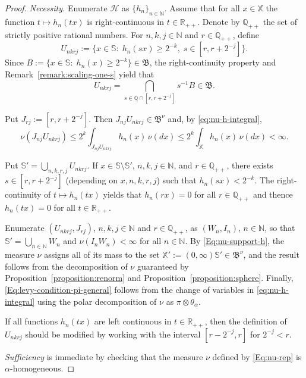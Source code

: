 \documentclass[12pt]{amsart}
\numberwithin{equation}{section}
\numberwithin{figure}{section}
\theoremstyle{plain} \newtheorem{theorem}{Theorem}[section]
\theoremstyle{plain} \newtheorem{proposition}[theorem]{Proposition}
\theoremstyle{plain} \newtheorem{lemma}[theorem]{Lemma}
\theoremstyle{plain} \newtheorem{corollary}[theorem]{Corollary}
\theoremstyle{definition} \newtheorem{definition}[theorem]{Definition}
\theoremstyle{definition} \newtheorem{notation}[theorem]{Notation}
\theoremstyle{remark} \newtheorem{remark}[theorem]{Remark}
\theoremstyle{remark} \newtheorem{example}[theorem]{Example}
\theoremstyle{definition} \newtheorem{assumption}{Assumption}
\newcommand{\bN}{\mathbb{N}}
\newcommand{\bQ}{\mathbb{Q}}
\newcommand{\bR}{\mathbb{R}}
\newcommand{\bS}{\mathbb{S}}
\newcommand{\bX}{\mathbb{X}}
\newcommand{\cH}{\mathcal{H}}
\newcommand{\salg}{\mathfrak{B}}
\begin{document}
\begin{proof}
  \textsl{Necessity.} Enumerate $\cH$ as $\{h_n\}_{n \in \bN}$. Assume
  that for all $x \in \bX$ the function $t \mapsto h_n(tx)$ is 
	right-continuous in $t\in\bR_{++}$.  Denote by $\bQ_{++}$ the set of
  strictly positive rational numbers. For $n,k,j\in\bN$ and
  $r\in\bQ_{++}$, define
  \begin{displaymath}
    U_{nkrj}:=\{x\in\bS:\; h_n(sx)\geq 2^{-k},\; s\in[r,r+2^{-j}]\}.
  \end{displaymath}
  Since $B:=\{x \in \bS:\;h_n(x)\geq 2^{-k}\} \in \salg$, the
	right-continuity property and Remark~\ref{remark:scaling-one-s} yield that
  \begin{displaymath}
    U_{nkrj}=\bigcap_{s\in\bQ\cap[r,r+2^{-j}]}s^{-1}B\in \salg.
  \end{displaymath}

  Put $J_{rj} :=[r,r+2^{-j}]$. Then $J_{nj} U_{nkrj} \in \salg^\nu$
  and, by \eqref{eq:nu-h-integral},
  \begin{displaymath}
    \nu(J_{nj} U_{nkrj}) 
    \leq 2^k \int_{J_{nj} U_{nkrj}} h_n(x) \, \nu(dx)
    \leq 2^k \int_\bX h_n(x) \, \nu(dx)<\infty.
  \end{displaymath}
  
  Put $\bS' = \bigcup_{n,k,r,j} U_{nkrj}$.  If $x\in\bS\setminus\bS'$,
  $n,k,j \in \bN$, and $r \in \bQ_{++}$, there exists $s \in
  [r,r+2^{-j}]$ (depending on $x,n,k,r,j$) such that $h_n(s
  x)<2^{-k}$.  The right-continuity of $t \mapsto h_n(t x)$ yields
  that $h_n(r x)=0$ for all $r\in\bQ_{++}$ and thence $h_n(tx)=0$ for
  all $t\in\bR_{++}$.
	
  Enumerate $(U_{nkrj}, J_{rj})$, $n,k,j\in\bN$ and $r\in\bQ_{++}$, as
  $(W_n, I_n)$, $n \in \bN$, so that $\bS' = \bigcup_{n \in \bN} W_n$
  and $\nu(I_n W_n)< \infty$ for all $n \in \bN$.  By
  \eqref{Eq:nu-support-h}, the measure $\nu$ assigns all of its mass
  to the set $\bX':= (0,\infty) \bS' \in \salg^\nu$, and the result
  follows from the decomposition of $\nu$ guaranteed by
  Proposition~\ref{proposition:renorm} and
  Proposition~\ref{proposition:sphere}.  Finally,
  \eqref{Eq:levy-condition-pi-general} follows from the change of
  variables in \eqref{eq:nu-h-integral} using the polar decomposition of
  $\nu$ as $\pi\otimes\theta_\alpha$.

  If all functions $h_n(tx)$ are left continuous in $t\in\bR_{++}$,
  then the definition of $U_{nkrj}$ should be modified by working with
  the interval $[r-2^{-j},r]$ for $2^{-j}<r$. 

  \textsl{Sufficiency} is immediate by checking that the measure $\nu$
  defined by \eqref{Eq:nu-rep} is $\alpha$-homogeneous.
\end{proof}
\end{document}

